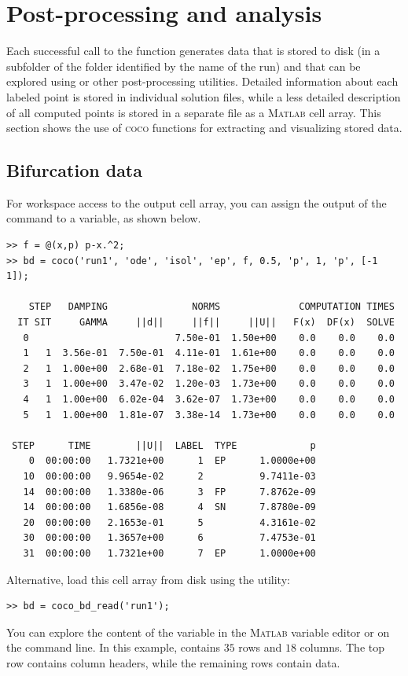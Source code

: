 \section{Post-processing and analysis}
Each successful call to the  function generates data that is stored to disk (in a subfolder of the  folder identified by the name of the run) and that can be explored using  or other post-processing utilities. Detailed information about each labeled point is stored in individual solution files, while a less detailed description of all computed points is stored in a separate file as a \textsc{Matlab} cell array. This section shows the use of \textsc{coco} functions for extracting and visualizing stored data.

\subsection{Bifurcation data}
For workspace access to the output cell array, you can assign the output of the  command to a variable, as shown below.
\begin{lstlisting}[language=coco-highlight,frame=lines]
>> f = @(x,p) p-x.^2;
>> bd = coco('run1', 'ode', 'isol', 'ep', f, 0.5, 'p', 1, 'p', [-1 1]);

    STEP   DAMPING               NORMS              COMPUTATION TIMES
  IT SIT     GAMMA     ||d||     ||f||     ||U||   F(x)  DF(x)  SOLVE
   0                          7.50e-01  1.50e+00    0.0    0.0    0.0
   1   1  3.56e-01  7.50e-01  4.11e-01  1.61e+00    0.0    0.0    0.0
   2   1  1.00e+00  2.68e-01  7.18e-02  1.75e+00    0.0    0.0    0.0
   3   1  1.00e+00  3.47e-02  1.20e-03  1.73e+00    0.0    0.0    0.0
   4   1  1.00e+00  6.02e-04  3.62e-07  1.73e+00    0.0    0.0    0.0
   5   1  1.00e+00  1.81e-07  3.38e-14  1.73e+00    0.0    0.0    0.0

 STEP      TIME        ||U||  LABEL  TYPE             p
    0  00:00:00   1.7321e+00      1  EP      1.0000e+00
   10  00:00:00   9.9654e-02      2          9.7411e-03
   14  00:00:00   1.3380e-06      3  FP      7.8762e-09
   14  00:00:00   1.6856e-08      4  SN      7.8780e-09
   20  00:00:00   2.1653e-01      5          4.3161e-02
   30  00:00:00   1.3657e+00      6          7.4753e-01
   31  00:00:00   1.7321e+00      7  EP      1.0000e+00
\end{lstlisting}
Alternative, load this cell array from disk using the  utility:
\begin{lstlisting}[language=coco-highlight,frame=lines]
>> bd = coco_bd_read('run1');
\end{lstlisting}
You can explore the content of the  variable in the \textsc{Matlab} variable editor or on the command line. In this example,  contains $35$ rows and $18$ columns. The top row contains column headers, while the remaining rows contain data.

